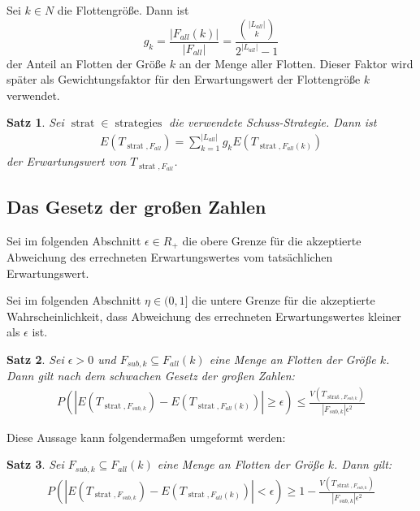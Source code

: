 \documentclass[a4paper,12pt]{llncs}
\numberwithin{equation}{section}
\newtheorem{satz}{Satz}
\DeclareMathOperator{\strat}{strat}
\DeclareMathOperator{\strategies}{strategies}
\begin{document}
\begin{definition}
Sei $k \in N$ die Flottengröße.
Dann ist
\[
g_k=\frac{|F_{all}(k)|}{|F_{all}|}=\frac{\binom{|L_{all}|}{k}}{2^{|L_{all}|} - 1}
\]
der Anteil an Flotten der Größe $k$ an der Menge aller Flotten. Dieser Faktor wird später als Gewichtungsfaktor für den Erwartungswert der Flottengröße $k$ verwendet.
\end{definition}

\begin{satz}
Sei $\strat \in \strategies$ die verwendete Schuss-Strategie.
Dann ist
\begin{align}
E(T_{\strat,F_{all}})=\sum_{k=1}^{|L_{all}|} g_k E(T_{\strat,F_{all}(k)})
\nonumber
\end{align}
der Erwartungswert von $T_{\strat,F_{all}}$.
\end{satz}


\subsection{Das Gesetz der großen Zahlen}

\begin{definition}
Sei im folgenden Abschnitt $\epsilon \in R_+$ die obere Grenze für die akzeptierte Abweichung des errechneten Erwartungswertes vom tatsächlichen Erwartungswert.

Sei im folgenden Abschnitt $\eta \in (0,1]$ die untere Grenze für die akzeptierte Wahrscheinlichkeit, dass Abweichung des errechneten Erwartungswertes kleiner als $\epsilon$ ist. 
\end{definition}

\begin{satz}
Sei $\epsilon > 0$ und $F_{sub,k} \subseteq F_{all}(k)$ eine Menge an Flotten der Größe $k$.
Dann gilt nach dem schwachen Gesetz der großen Zahlen:
\begin{align}
P(|E(T_{\strat,F_{sub,k}}) - E(T_{\strat,F_{all}(k)})| \geq \epsilon) \leq \frac{V(T_{\strat,F_{sub,k}})}{|F_{sub,k}| \epsilon^2}
\nonumber
\end{align}
\end{satz}

Diese Aussage kann folgendermaßen umgeformt werden:

\begin{satz}
Sei $F_{sub,k} \subseteq F_{all}(k)$ eine Menge an Flotten der Größe $k$.
Dann gilt:
\begin{align}
P(|E(T_{\strat,F_{sub,k}}) - E(T_{\strat,F_{all}(k)})| < \epsilon) \geq 1 - \frac{V(T_{\strat,F_{sub,k}})}{|F_{sub,k}| \epsilon^2}
\nonumber
\end{align}
\end{satz}
\end{document}
